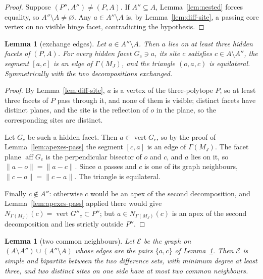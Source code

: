 \documentclass[11pt]{amsart}
\newtheorem{lemma}[theorem]{Lemma}
\theoremstyle{definition}
\newcommand{\aff}{\operatorname{aff}}
\newcommand{\GammaM}{\Gamma(M_J)}
\begin{document}
\begin{proof}
Suppose $(P'',A'')\neq(P,A)$.  If $A''\subseteq A$,
Lemma~\ref{lem:nested} forces equality, so $A''\setminus A\neq\varnothing$.
Any $a\in A''\setminus A$ is, by Lemma~\ref{lem:diff-site}, a passing core
vertex on no visible hinge facet, contradicting the hypothesis.
\end{proof}

\begin{lemma}[exchange edges]
\label{lem:exchange-edges}
Let $a\in A''\setminus A$.  Then $a$ lies on at least three hidden facets of
$(P,A)$.  For every hidden facet $G_c\ni a$, its site $c$ satisfies
$c\in A\setminus A''$, the segment $[a,c]$ is an edge of $\GammaM$, and the
triangle $(o,a,c)$ is equilateral.  Symmetrically with the two decompositions
exchanged.
\end{lemma}

\begin{proof}
By Lemma~\ref{lem:diff-site}, $a$ is a vertex of the three-polytope $P$, so at
least three facets of $P$ pass through it, and none of them is visible;
distinct facets have distinct planes, and the site is the reflection of $o$ in
the plane, so the corresponding sites are distinct.

Let $G_c$ be such a hidden facet.  Then $a\in\operatorname{vert}G_c$, so by
the proof of Lemma~\ref{lem:apexes-pass} the segment $[c,a]$ is an edge of
$\GammaM$.  The facet plane $\aff G_c$ is the perpendicular bisector of $o$
and $c$, and $a$ lies on it, so $\|a-o\|=\|a-c\|$.  Since $a$ passes and $c$
is one of its graph neighbours, $\|c-o\|=\|c-a\|$.  The triangle is
equilateral.

Finally $c\notin A''$: otherwise $c$ would be an apex of the second
decomposition, and Lemma~\ref{lem:apexes-pass} applied there would give
$N_{\GammaM}(c)=\operatorname{vert}G''_c\subset P''$; but
$a\in N_{\GammaM}(c)$ is an apex of the second decomposition and lies strictly
outside $P''$.
\end{proof}

\begin{lemma}[two common neighbours]
\label{lem:common}
Let $\mathcal E$ be the graph on
$(A\setminus A'')\cup(A''\setminus A)$ whose edges are the pairs $\{a,c\}$
of Lemma~\ref{lem:exchange-edges}.  Then $\mathcal E$ is simple and
bipartite between the two difference sets, with minimum degree at least three,
and two distinct sites on one side have at most two common neighbours.
\end{lemma}
\end{document}
